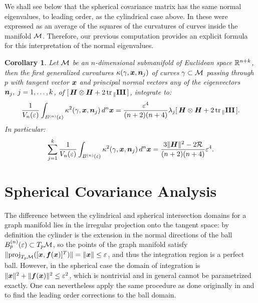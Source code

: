 \documentclass[letterpaper, reqno, 11pt]{amsart}
\newtheorem{corollary}[theorem]{Corollary}
\theoremstyle{definition}
\theoremstyle{remark}
\numberwithin{equation}{section}
\begin{document}
We shall see below that the spherical covariance matrix has the same normal eigenvalues, to leading order, as the cylindrical case above. In \cite{solis1993,solis2000} these were expressed as an average of the squares of the curvatures of curves inside the manifold $\cM$. Therefore, our previous computation provides an explicit formula for this interpretation of the normal eigenvalues.

\begin{corollary}
	Let $\cM$ be an $n$-dimensional submanifold of Euclidean space $\RR^{n+k}$, then the first generalized curvatures $\ka(\ga,\bx,\bN_j)$ of curves $\ga\subset\cM$ passing through $p$ with tangent vector $\bx$ and principal normal vectors any of the eigenvectors $\bN_j,\; j=1,\dots,k$, of $[\,\bH\otimes\bH + 2\,\tr_\parallel\III\,]$, integrate to:
\begin{equation}
	\frac{1}{V_n(\vep)}\int_{B^{(n)}(\vep)}\ka^2(\ga,\bx,\bN_j)\, d^n\bx = \frac{\vep^4}{(n+2)(n+4)}  \lbd_j[\,\bH\otimes\bH + 2\,\tr_\parallel\III\,].
\end{equation}
In particular:
	\begin{equation}
		\sum_{j=1}^k\frac{1}{V_n(\vep)}\int_{B^{(n)}(\vep)}\ka^2(\ga,\bx,\bN_j)\, d^n\bx = \frac{3\|\bH\|^2-2\cR}{(n+2)(n+4)}\vep^4 .
	\end{equation}
\end{corollary}




\section{Spherical Covariance Analysis}\label{sec:SphCov}

The difference between the cylindrical and spherical intersection domains for a graph manifold lies in the irregular projection onto the tangent space: by definition the cylinder is the extension in the normal directions of the ball $B^{(n)}_p(\vep)\subset T_p\cM$, so the points of the graph manifold satisfy $\|\projj{[\bx,\bs{f}(\bx)]^T}{T_p\cM}\|=\|\bx\| \leq\vep$, and thus the integration region is a perfect ball. However, in the spherical case the domain of integration is $\|\bx\|^2+\|\bs{f}(\bx)\|^2 \leq \vep^2$, which is nontrivial and in general cannot be parametrized exactly. One can nevertheless apply the same procedure as done originally in \cite{pottmann2007} and \cite{alvarez2018a} to find the leading order corrections to the ball domain.
\end{document}
